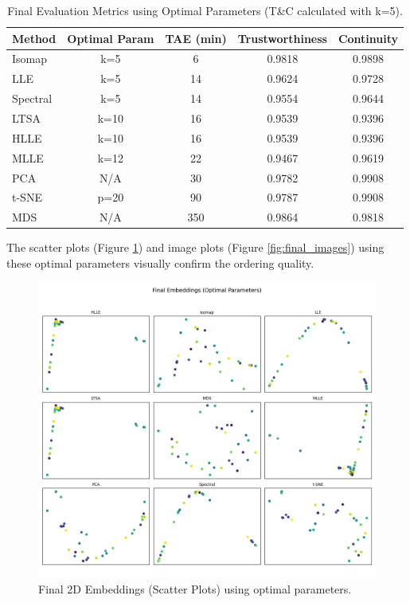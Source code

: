 \documentclass{article}
\begin{document}
\begin{table}[h]
  \caption{Final Evaluation Metrics using Optimal Parameters (T\&C calculated with k=5).}
  \label{tab:final_metrics}
  \centering
  \begin{tabular}{lcccc}
    \toprule
    Method   & Optimal Param & TAE (min) & Trustworthiness & Continuity \\
    \midrule
    Isomap   & k=5           & 6         & 0.9818          & 0.9898     \\
    LLE      & k=5           & 14        & 0.9624          & 0.9728     \\
    Spectral & k=5           & 14        & 0.9554          & 0.9644     \\
    LTSA     & k=10          & 16        & 0.9539          & 0.9396     \\
    HLLE     & k=10          & 16        & 0.9539          & 0.9396     \\
    MLLE     & k=12          & 22        & 0.9467          & 0.9619     \\
    PCA      & N/A           & 30        & 0.9782          & 0.9908     \\
    t-SNE    & p=20          & 90        & 0.9787          & 0.9908     \\
    MDS      & N/A           & 350       & 0.9864          & 0.9818     \\
    \bottomrule
  \end{tabular}
\end{table}

The scatter plots (Figure \ref{fig:final_scatter}) and image plots (Figure \ref{fig:final_images}) using these optimal parameters visually confirm the ordering quality.

\begin{figure}[htbp]
  \centering
  \includegraphics[width=0.8\linewidth]{../figs/final_scatter.png} %
  \caption{Final 2D Embeddings (Scatter Plots) using optimal parameters.}
  \label{fig:final_scatter}
\end{figure}
\end{document}
